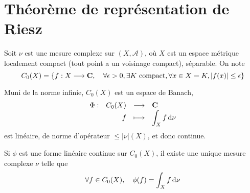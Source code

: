 \section{Théorème de représentation de Riesz}

\begin{dfn}
Soit $\nu$ est une mesure complexe sur  $(X, \mathcal  A)$, où $X$ est un espace métrique localement compact (tout point a un voisinage compact), séparable. On note \[
    C_0(X) = \left\{ f : X \longrightarrow \mathbf C, \quad  \forall  \epsilon>0, \exists  K\text{ compact}, \forall  x \in  X\bm- K, |f(x)|\leq \epsilon \right\} 
\]
\end{dfn}

\begin{prop}
    Muni de la norme infinie, $C_0(X)$ est un espace de Banach,  \[
    \begin{array}{rrcl}
        \Phi:& C_0(X) & \longrightarrow & \mathbf C \\
        & f & \longmapsto & \displaystyle \int_X f\mathop{}\!\mathrm d\nu
    \end{array}
    \] 
    est linéaire, de norme d'opérateur $\leq |\nu|(X)$, et donc continue.
\end{prop}

\begin{thm}
    Si $\phi$ est une forme linéaire continue sur  $C_0(X)$, il existe une unique mesure complexe  $\nu$ telle que  \[
        \forall  f \in  C_0(X), \quad  \phi(f)=\int_X f\mathop{}\!\mathrm d\nu
    \] 
\end{thm}
